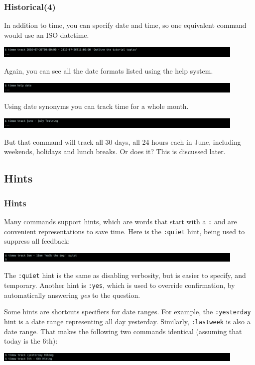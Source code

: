 \documentclass[t,handout]{beamer}
\begin{document}
\begin{frame}[fragile]\frametitle{Historical(4)}
    In addition to time, you can specify date and time, so one equivalent command would use an ISO datetime.

    \includegraphics[width=12cm]{images/tutorial18.png}

    Again, you can see all the date formats listed using the help system.

    \includegraphics[width=12cm]{images/tutorial19.png}

    Using date synonyms you can track time for a whole month.

    \includegraphics[width=12cm]{images/tutorial20.png}

    But that command will track all 30 days, all 24 hours each in June, including weekends, holidays and lunch breaks. Or does it? This is discussed later.
\end{frame}

\subsection{Hints}

\begin{frame}[fragile]\frametitle{Hints}
    Many commands support hints, which are words that start with a \verb=:= and are convenient representations to save time. Here is the \verb=:quiet= hint, being used to suppress all feedback:

    \includegraphics[width=12cm]{images/tutorial21.png}

    The \verb=:quiet= hint is the same as disabling verbosity, but is easier to specify, and temporary. Another hint is \verb=:yes=, which is used to override confirmation, by automatically answering \textit{yes} to the question.

    Some hints are shortcuts specifiers for date ranges. For example, the \verb=:yesterday= hint is a date range representing all day yesterday. Similarly, \verb=:lastweek= is also a date range. That makes the following two commands identical (assuming that today is the 6th):

    \includegraphics[width=12cm]{images/tutorial22.png}
\end{frame}
\end{document}
